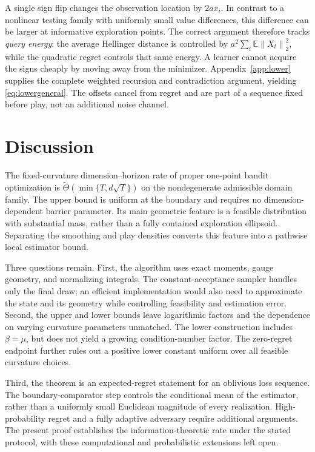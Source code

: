 \documentclass[11pt]{article}
\numberwithin{equation}{section}
\newcommand{\E}{\mathbb E}
\newcommand{\norm}[1]{\left\|#1\right\|}
\newcounter{algorithm}
\theoremstyle{definition}
\theoremstyle{remark}
\begin{document}
A single sign flip changes the observation location by $2a x_i$. In contrast
to a nonlinear testing family with uniformly small value differences, this
difference can be larger at informative exploration points. The correct
argument therefore tracks \emph{query energy}: the average Hellinger distance
is controlled by $a^2\sum_t\E\norm{X_t}_2^2$, while the quadratic regret
controls that same energy. A learner cannot acquire the signs cheaply by
moving away from the minimizer. Appendix~\ref{app:lower} supplies the complete
weighted recursion and contradiction argument, yielding
\eqref{eq:lowergeneral}. The offsets cancel from regret and are part of a
sequence fixed before play, not an additional noise channel.

\section{Discussion}\label{sec:discussion}
The fixed-curvature dimension--horizon rate of proper one-point bandit
optimization is $\widetilde\Theta(\min\{T,d\sqrt T\})$ on the nondegenerate
admissible domain family. The upper bound is uniform at the boundary and
requires no dimension-dependent barrier parameter. Its main geometric feature
is a feasible distribution with substantial mass, rather than a fully contained
exploration ellipsoid. Separating the smoothing and play densities converts
this feature into a pathwise local estimator bound.

Three questions remain. First, the algorithm uses exact moments, gauge
geometry, and normalizing integrals. The constant-acceptance sampler handles
only the final draw; an efficient implementation would also need to approximate
the state and its geometry while controlling feasibility and estimation error.
Second, the upper and lower bounds leave logarithmic factors and the dependence
on varying curvature parameters unmatched. The lower construction includes
$\beta=\mu$, but does not yield a growing condition-number factor. The
zero-regret endpoint further rules out a positive lower constant uniform over
all feasible curvature choices.

Third, the theorem is an expected-regret statement for an oblivious loss
sequence. The boundary-comparator step controls the conditional mean of the
estimator, rather than a uniformly small Euclidean magnitude of every
realization. High-probability regret and a fully adaptive adversary require
additional arguments. The present proof establishes the information-theoretic
rate under the stated protocol, with these computational and probabilistic
extensions left open.
\end{document}

